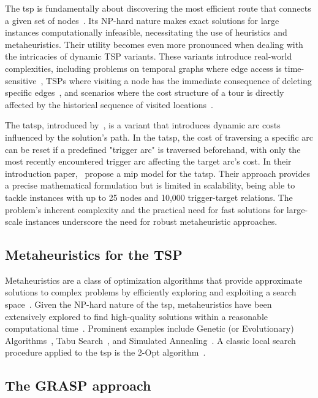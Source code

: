 \documentclass[twocolumn, switch]{article} %
\begin{document}
The \gls{tsp} is fundamentally about discovering the most efficient route that connects a given set of nodes~\cite{Applegate2011}. 
Its NP-hard nature makes exact solutions for large instances computationally infeasible, necessitating the use of heuristics and metaheuristics.
Their utility becomes even more pronounced when dealing with the intricacies of dynamic TSP variants.
These variants introduce real-world complexities, including problems on temporal graphs where edge access is time-sensitive~\cite{timedependenttsp}, 
TSPs where visiting a node has the immediate consequence of deleting specific edges~\cite{traversaldependenttsp}, and scenarios where the cost structure of a tour is directly affected by the historical sequence of visited locations~\cite{Bossek2020}.

The \gls{tatsp}, introduced by~\citet{Cerrone}, is a variant that introduces dynamic arc costs influenced by the solution's path. 
In the \gls{tatsp}, the cost of traversing a specific arc can be reset if a predefined "trigger arc" is traversed beforehand, 
with only the most recently encountered trigger arc affecting the target arc's cost. In their introduction paper,~\citet{Cerrone} 
propose a \gls{mip} model for the \gls{tatsp}. Their approach provides a precise mathematical formulation 
but is limited in scalability, being able to tackle instances with up to 25 nodes and 10,000 trigger-target relations. 
The problem's inherent complexity and the practical need for fast solutions for large-scale instances underscore the need for robust metaheuristic approaches.

\subsection{Metaheuristics for the TSP}
\label{sec:metaheuristics_tsp}

Metaheuristics are a class of optimization algorithms that provide approximate solutions to complex problems by efficiently exploring and exploiting a search space~\cite{Gendreau2010}.
Given the NP-hard nature of the \gls{tsp}, metaheuristics have been extensively explored to find high-quality solutions within a reasonable computational time~\cite{toaza2023}.
Prominent examples include Genetic (or Evolutionary) Algorithms~\cite{Larranaga1999}, Tabu Search~\cite{Knox1994}, and Simulated Annealing~\cite{anttsp}.
A classic local search procedure applied to the \gls{tsp} is the 2-Opt algorithm~\cite{Croes1958}.

\subsection{The GRASP approach}
\end{document}
